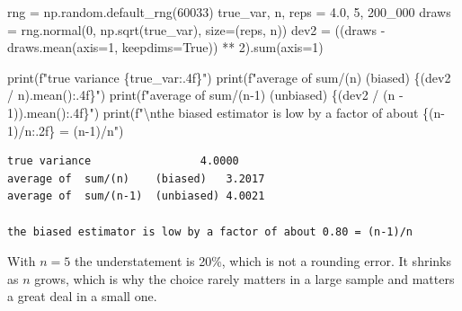 \documentclass[
  letterpaper,
  10pt,
  twoside,
  openright,
  numbers=noenddot,
  chapterprefix=true]{scrbook}
\newenvironment{Shaded}{}{}
\newcommand{\BuiltInTok}[1]{\textcolor[rgb]{0.84,0.23,0.29}{#1}}
\newcommand{\CharTok}[1]{\textcolor[rgb]{0.01,0.18,0.38}{#1}}
\newcommand{\DecValTok}[1]{\textcolor[rgb]{0.00,0.36,0.77}{#1}}
\newcommand{\FloatTok}[1]{\textcolor[rgb]{0.00,0.36,0.77}{#1}}
\newcommand{\NormalTok}[1]{\textcolor[rgb]{0.14,0.16,0.18}{#1}}
\newcommand{\OperatorTok}[1]{\textcolor[rgb]{0.14,0.16,0.18}{#1}}
\newcommand{\SpecialCharTok}[1]{\textcolor[rgb]{0.00,0.36,0.77}{#1}}
\newcommand{\SpecialStringTok}[1]{\textcolor[rgb]{0.01,0.18,0.38}{#1}}
\newcommand{\VariableTok}[1]{\textcolor[rgb]{0.89,0.38,0.04}{#1}}
\begin{document}
\label{check-n-minus-1}
\begin{Shaded}
\begin{Highlighting}[]
\NormalTok{rng }\OperatorTok{=}\NormalTok{ np.random.default\_rng(}\DecValTok{60033}\NormalTok{)}
\NormalTok{true\_var, n, reps }\OperatorTok{=} \FloatTok{4.0}\NormalTok{, }\DecValTok{5}\NormalTok{, }\DecValTok{200\_000}
\NormalTok{draws }\OperatorTok{=}\NormalTok{ rng.normal(}\DecValTok{0}\NormalTok{, np.sqrt(true\_var), size}\OperatorTok{=}\NormalTok{(reps, n))}
\NormalTok{dev2 }\OperatorTok{=}\NormalTok{ ((draws }\OperatorTok{{-}}\NormalTok{ draws.mean(axis}\OperatorTok{=}\DecValTok{1}\NormalTok{, keepdims}\OperatorTok{=}\VariableTok{True}\NormalTok{)) }\OperatorTok{**} \DecValTok{2}\NormalTok{).}\BuiltInTok{sum}\NormalTok{(axis}\OperatorTok{=}\DecValTok{1}\NormalTok{)}

\BuiltInTok{print}\NormalTok{(}\SpecialStringTok{f"true variance                 }\SpecialCharTok{\{}\NormalTok{true\_var}\SpecialCharTok{:.4f\}}\SpecialStringTok{"}\NormalTok{)}
\BuiltInTok{print}\NormalTok{(}\SpecialStringTok{f"average of  sum/(n)    (biased)   }\SpecialCharTok{\{}\NormalTok{(dev2 }\OperatorTok{/}\NormalTok{ n)}\SpecialCharTok{.}\NormalTok{mean()}\SpecialCharTok{:.4f\}}\SpecialStringTok{"}\NormalTok{)}
\BuiltInTok{print}\NormalTok{(}\SpecialStringTok{f"average of  sum/(n{-}1)  (unbiased) }\SpecialCharTok{\{}\NormalTok{(dev2 }\OperatorTok{/}\NormalTok{ (n }\OperatorTok{{-}} \DecValTok{1}\NormalTok{))}\SpecialCharTok{.}\NormalTok{mean()}\SpecialCharTok{:.4f\}}\SpecialStringTok{"}\NormalTok{)}
\BuiltInTok{print}\NormalTok{(}\SpecialStringTok{f"}\CharTok{\textbackslash{}n}\SpecialStringTok{the biased estimator is low by a factor of about }\SpecialCharTok{\{}\NormalTok{(n}\OperatorTok{{-}}\DecValTok{1}\NormalTok{)}\OperatorTok{/}\NormalTok{n}\SpecialCharTok{:.2f\}}\SpecialStringTok{ = (n{-}1)/n"}\NormalTok{)}
\end{Highlighting}
\end{Shaded}

\begin{verbatim}
true variance                 4.0000
average of  sum/(n)    (biased)   3.2017
average of  sum/(n-1)  (unbiased) 4.0021

the biased estimator is low by a factor of about 0.80 = (n-1)/n
\end{verbatim}

With \(n = 5\) the understatement is 20\%, which is not a rounding
error. It shrinks as \(n\) grows, which is why the choice rarely matters
in a large sample and matters a great deal in a small one.
\end{document}
